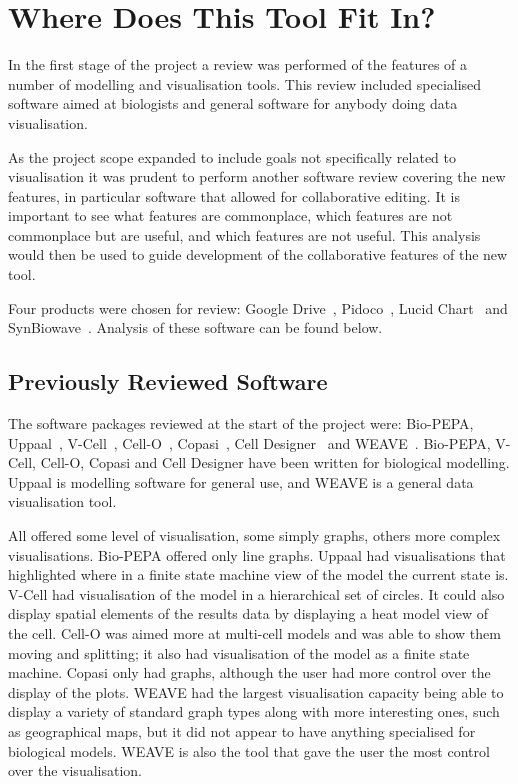 \section{Where Does This Tool Fit In?}

In the first stage of the project a review was performed of the features of a number of modelling and visualisation tools.  This review included specialised software aimed at biologists and general software for anybody doing data visualisation.

As the project scope expanded to include goals not specifically related to visualisation it was prudent to perform another software review covering the new features, in particular software that allowed for collaborative editing.  It is important to see what features are commonplace, which features are not commonplace but are useful, and which features are not useful. This analysis would then be used to guide development of the collaborative features of the new tool.

Four products were chosen for review: Google Drive~\cite{g_drive}, Pidoco~\cite{pidoco}, Lucid Chart~\cite{lucid} and SynBiowave~\cite{sbw}.  Analysis of these software can be found below.

\subsection{Previously Reviewed Software}

The software packages reviewed at the start of the project were: Bio-PEPA, Uppaal~\cite{uppaal}, V-Cell~\cite{vcell}, Cell-O~\cite{cello}, Copasi~\cite{copasi}, Cell Designer~\cite{celldesigner} and WEAVE~\cite{weave}.  Bio-PEPA, V-Cell, Cell-O, Copasi and Cell Designer have been written for biological modelling.  Uppaal is modelling software for general use, and WEAVE is a general data visualisation tool.

All offered some level of visualisation, some simply graphs, others more complex visualisations.  Bio-PEPA offered only line graphs.  Uppaal had visualisations that highlighted where in a finite state machine view of the model the current state is.  V-Cell had visualisation of the model in a hierarchical set of circles. It could also display spatial elements of the results data by displaying a heat model view of the cell.  Cell-O was aimed more at multi-cell models and was able to show them moving and splitting; it also had visualisation of the model as a finite state machine.  Copasi only had graphs, although the user had more control over the display of the plots.  WEAVE had the largest visualisation capacity being able to display a variety of standard graph types along with more interesting ones, such as geographical maps, but it did not appear to have anything specialised for biological models.  WEAVE is also the tool that gave the user the most control over the visualisation.

